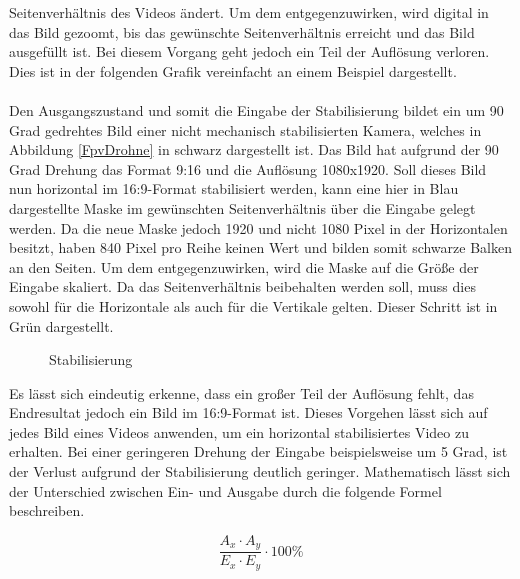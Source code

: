     Seitenverhältnis des Videos ändert. Um dem entgegenzuwirken, wird digital in das Bild gezoomt,
    bis das gewünschte Seitenverhältnis erreicht und das Bild ausgefüllt ist. Bei diesem Vorgang
    geht jedoch ein Teil der Auflösung verloren. Dies ist in der folgenden Grafik vereinfacht an
    einem Beispiel dargestellt. \\
    \\
    Den Ausgangszustand und somit die Eingabe der Stabilisierung bildet ein um 90 Grad gedrehtes
    Bild einer nicht mechanisch stabilisierten Kamera, welches in Abbildung \ref*{FpvDrohne} in schwarz dargestellt
    ist. Das Bild hat aufgrund der 90 Grad Drehung das Format 9:16 und die Auflösung 1080x1920. Soll
    dieses Bild nun horizontal im 16:9-Format stabilisiert werden, kann eine hier in Blau dargestellte
    Maske im gewünschten Seitenverhältnis über die Eingabe gelegt werden. Da die neue Maske jedoch 1920
    und nicht 1080 Pixel in der Horizontalen besitzt, haben 840 Pixel pro Reihe keinen Wert und bilden
    somit schwarze Balken an den Seiten. Um dem entgegenzuwirken, wird die Maske auf die Größe der
    Eingabe skaliert. Da das Seitenverhältnis beibehalten werden soll, muss dies sowohl für die
    Horizontale als auch für die Vertikale gelten. Dieser Schritt ist in Grün dargestellt.

    \begin{figure}[ht]
        \centering
        \def\svgwidth{\linewidth}
        
        \vspace{0.5cm}
        \caption{Stabilisierung}
        \label{stabilisierung}
    \end{figure}
    
    Es lässt sich eindeutig erkenne, dass ein großer Teil der Auflösung fehlt, das Endresultat jedoch
    ein Bild im 16:9-Format ist. Dieses Vorgehen lässt sich auf jedes Bild eines Videos anwenden, um
    ein horizontal stabilisiertes Video zu erhalten. Bei einer geringeren Drehung der Eingabe beispielsweise
    um 5 Grad, ist der Verlust aufgrund der Stabilisierung deutlich geringer. Mathematisch lässt sich
    der Unterschied zwischen Ein- und Ausgabe durch die folgende Formel beschreiben.

    \begin{equation}
        \frac{A_x \cdot A_y}{E_x \cdot E_y} \cdot 100\%
    \end{equation}


